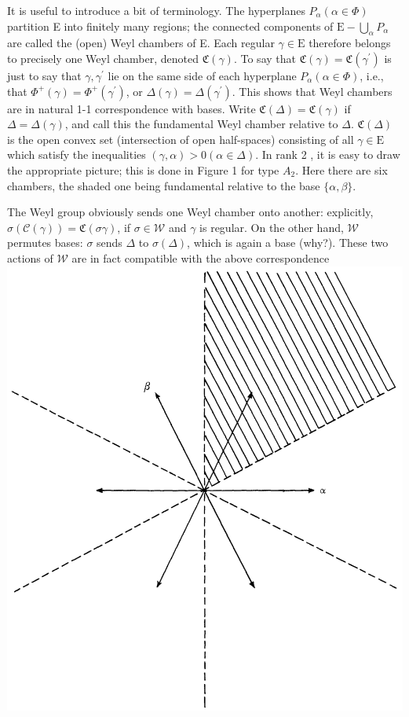 \documentclass[10pt]{article}
\begin{document}
It is useful to introduce a bit of terminology. The hyperplanes $P_{\alpha}(\alpha \in \Phi)$ partition E into finitely many regions; the connected components of $\mathrm{E}-\bigcup_{\alpha} P_{\alpha}$ are called the (open) Weyl chambers of E. Each regular $\gamma \in \mathrm{E}$ therefore belongs to precisely one Weyl chamber, denoted $\mathfrak{C}(\gamma)$. To say that $\mathfrak{C}(\gamma)=\mathfrak{C}\left(\gamma^{\prime}\right)$ is just to say that $\gamma, \gamma^{\prime}$ lie on the same side of each hyperplane $P_{\alpha}(\alpha \in \Phi)$, i.e., that $\Phi^{+}(\gamma)=\Phi^{+}\left(\gamma^{\prime}\right)$, or $\Delta(\gamma)=\Delta\left(\gamma^{\prime}\right)$. This shows that Weyl chambers are in natural 1-1 correspondence with bases. Write $\mathfrak{C}(\Delta)=\mathfrak{C}(\gamma)$ if $\Delta=\Delta(\gamma)$, and call this the fundamental Weyl chamber relative to $\Delta$. $\mathfrak{C}(\Delta)$ is the open convex set (intersection of open half-spaces) consisting of all $\gamma \in \mathrm{E}$ which satisfy the inequalities $(\gamma, \alpha)>0(\alpha \in \Delta)$. In rank 2 , it is easy to draw the appropriate picture; this is done in Figure 1 for type $A_{2}$. Here there are six chambers, the shaded one being fundamental relative to the base $\{\alpha, \beta\}$.

The Weyl group obviously sends one Weyl chamber onto another: explicitly, $\sigma(\mathcal{C}(\gamma))=\mathfrak{C}(\sigma \gamma)$, if $\sigma \in \mathscr{W}$ and $\gamma$ is regular. On the other hand, $\mathscr{W}$ permutes bases: $\sigma$ sends $\Delta$ to $\sigma(\Delta)$, which is again a base (why?). These two actions of $\mathscr{W}$ are in fact compatible with the above correspondence\\
\includegraphics[max width=\textwidth, center]{2025_06_06_fac2836a92464059da43g-062}
\end{document}
